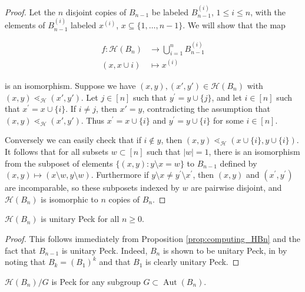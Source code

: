 \documentclass[smallextended, envcountsame, numbook]{svjour3}
\numberwithin{equation}{section}
\newcommand\Aut{\operatorname{Aut}}
\begin{document}
\begin{proof}
Let the $n$ disjoint copies of $B_{n-1}$ be labeled $B_{n-1}^{(i)}$, $1\le i\le n$, with the elements of $B_{n-1}^{(i)}$ labeled $x^{(i)}$, $x\subseteq \{1,\ldots,n-1\}$.  We will show that the map 

\begin{align*}
f\colon \mathcal{H}(B_n) &\longrightarrow \bigcup_{i=1}^n B_{n-1}^{(i)}\\
(x,x\cup{i})&\longmapsto x^{(i)}
\end{align*}

\noindent is an isomorphism.  Suppose we have $(x, y),(x', y') \in \mathcal H(B_n)$ with $(x, y) \lessdot_{\mathcal H} (x', y')$. Let $j\in [n]$ such that $y^\prime = y\cup\{j\}$, and let $i\in [n]$ such that $x^\prime = x\cup \{i\}$. If $i \ne j$, then $x' = y$, contradicting the assumption that $(x, y) \lessdot_{\mathcal H} (x', y')$. Thus $x^\prime = x\cup\{i\}$ and $y^\prime = y\cup\{i\}$ for some $i\in [n]$.

Conversely we can easily check that if $i\not\in y$, then $(x, y)\lessdot_{\mathcal{H}} (x\cup\{i\}, y\cup\{i\})$.  It follows that for all subsets $w \subset [n]$ such that $|w| = 1$, there is an isomorphism from the subposet of elements $\{(x, y)\colon y\setminus x = w\}$ to $B_{n-1}$ defined by $(x,y)\mapsto (x\setminus w,y\setminus w)$.  Furthermore if $y\setminus x \ne y^\prime \setminus x^\prime$, then $(x, y)$ and $(x^\prime, y^\prime)$ are incomparable, so these subposets indexed by $w$ are pairwise disjoint, and $\mathcal H(B_n)$ is isomorphic to $n$ copies of $B_{n}$.
\end{proof}

\begin{corollary}\label{cor:HBn_unitary_peck}
$\mathcal H(B_n)$ is unitary Peck for all $n\ge 0$.
\end{corollary}

\begin{proof}
This follows immediately from Proposition \ref{prop:computing_HBn} and the fact that $B_{n-1}$ is unitary Peck.  Indeed, $B_n$ is shown to be unitary Peck, in \cite[Theorem 2a]{quotients_stanley} by noting that $B_k = (B_1)^k$ and that $B_1$ is clearly unitary Peck.
\end{proof}

\begin{corollary}\label{cor:quotients_of_HBn_peck}
$\mathcal H(B_n)/G$ is Peck for any subgroup $G\subset \Aut(B_n)$.
\end{corollary}
\end{document}
